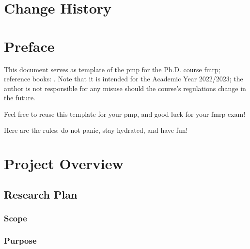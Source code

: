 \documentclass[a4paper, 10pt, oneside]{book}
\makeatletter
\newcommand*{\phd}{Ph.D.\@\xspace}
\makeatother
\begin{document}
\chapter*{Change History} \label{sec:change-history}

\clearpage

\chapter*{Preface} \label{sec:preface}

\noindent This document serves as template of the \acrfull{pmp} for the \phd course \acrfull{fmrp}; reference books: \cite{project_management_institute_guide_2017,schwalbe_information_2014}. Note that it is intended for the Academic Year 2022/2023; the author is not responsible for any misuse should the course's regulations change in the future.

\noindent Feel free to reuse this template for your \acrshort{pmp}, and good luck for your \acrlong{fmrp} exam!

\noindent Here are the rules: do not panic, stay hydrated, and have fun!

\tableofcontents
\clearpage
\sloppy
{}

\listoffigures
{}
\clearpage

\listoftables
{}
\clearpage

\mainmatter

\chapter{Project Overview}
\lipsum[1]

\section{Research Plan} \label{sec:purpose-scope-and-objectives}

\subsection{Scope}
\lipsum[1]

\subsection{Purpose}
\lipsum[1]
\end{document}
